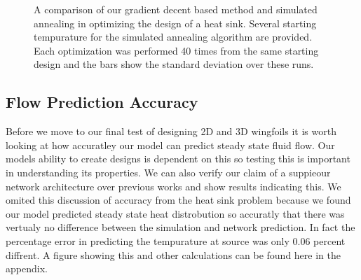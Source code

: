 \documentclass{article} %
\begin{document}
\begin{figure}[!t]
\begin{center}
\end{center}
\label{heat_sink_optimization}
\caption{A comparison of our gradient decent based method and simulated annealing in optimizing the design of a heat sink. Several starting tempurature for the simulated annealing algorithm are provided. Each optimization was performed 40 times from the same starting design and the bars show the standard deviation over these runs.}
\end{figure}

\begin{figure}[h]
\begin{center}
\end{center}
\end{figure}


\subsection{Flow Prediction Accuracy}

Before we move to our final test of designing 2D and 3D wingfoils it is worth looking at how accuratley our model can predict steady state fluid flow. Our models ability to create designs is dependent on this so testing this is important in understanding its properties. We can also verify our claim of a suppieour network architecture over previous works and show results indicating this. We omited this discussion of accuracy from the heat sink problem because we found our model predicted steady state heat distrobution so accuratly that there was vertualy no difference between the simulation and network prediction. In fact the percentage error in predicting the tempurature at source was only 0.06 percent diffrent. A figure showing this and other calculations can be found here in the appendix.
\end{document}
